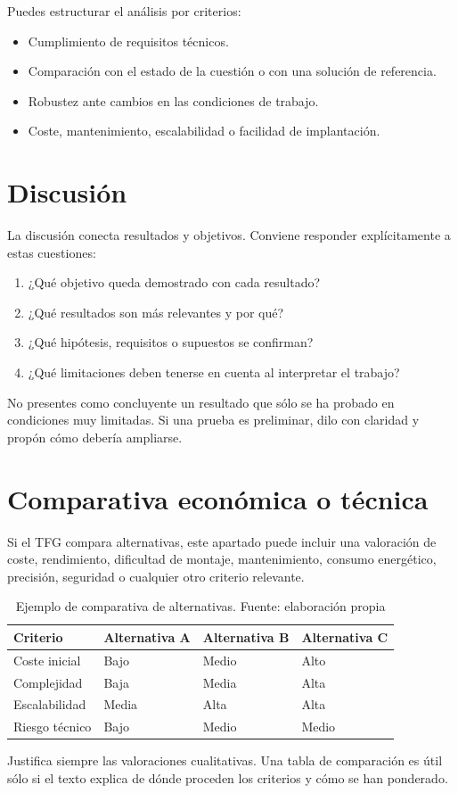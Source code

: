 Puedes estructurar el análisis por criterios:

\begin{itemize}
    \item Cumplimiento de requisitos técnicos.
    \item Comparación con el estado de la cuestión o con una solución de referencia.
    \item Robustez ante cambios en las condiciones de trabajo.
    \item Coste, mantenimiento, escalabilidad o facilidad de implantación.
\end{itemize}

\section{Discusión}
\label{sec:discusion}

La discusión conecta resultados y objetivos. Conviene responder explícitamente a
estas cuestiones:

\begin{enumerate}
    \item ¿Qué objetivo queda demostrado con cada resultado?
    \item ¿Qué resultados son más relevantes y por qué?
    \item ¿Qué hipótesis, requisitos o supuestos se confirman?
    \item ¿Qué limitaciones deben tenerse en cuenta al interpretar el trabajo?
\end{enumerate}

No presentes como concluyente un resultado que sólo se ha probado en condiciones
muy limitadas. Si una prueba es preliminar, dilo con claridad y propón cómo
debería ampliarse.

\section{Comparativa económica o técnica}
\label{sec:comparativa}

Si el TFG compara alternativas, este apartado puede incluir una valoración de
coste, rendimiento, dificultad de montaje, mantenimiento, consumo energético,
precisión, seguridad o cualquier otro criterio relevante.

\begin{table}[!ht]
    \footnotesize
    \centering
    \caption[Ejemplo de comparativa de alternativas]{Ejemplo de comparativa de alternativas. Fuente: elaboración propia}
    \label{tab:comparativa-alternativas}
    \begin{tabularx}{\textwidth}{lXXX}
        \toprule
        \textbf{Criterio} & \textbf{Alternativa A} & \textbf{Alternativa B} & \textbf{Alternativa C} \\
        \midrule
        Coste inicial & Bajo & Medio & Alto \\
        Complejidad & Baja & Media & Alta \\
        Escalabilidad & Media & Alta & Alta \\
        Riesgo técnico & Bajo & Medio & Medio \\
        \bottomrule
    \end{tabularx}
\end{table}

Justifica siempre las valoraciones cualitativas. Una tabla de comparación es
útil sólo si el texto explica de dónde proceden los criterios y cómo se han
ponderado.
